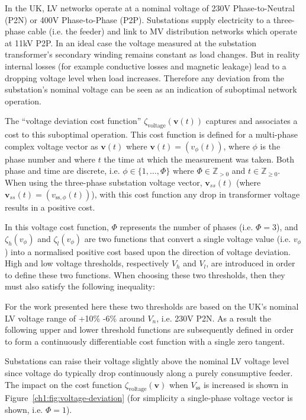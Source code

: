 In the UK, LV networks operate at a nominal voltage of 230V Phase-to-Neutral (P2N) or 400V Phase-to-Phase (P2P).
Substations supply electricity to a three-phase cable (i.e. the feeder) and link to MV distribution networks which operate at 11kV P2P.
In an ideal case the voltage measured at the substation transformer's secondary winding remains constant as load changes.
But in reality internal losses (for example conductive losses and magnetic leakage) lead to a dropping voltage level when load increases.
Therefore any deviation from the substation's nominal voltage can be seen as an indication of suboptimal network operation.

The ``voltage deviation cost function'' $\zeta_\text{voltage}(\textbf{v}(t))$ captures and associates a cost to this suboptimal operation.
This cost function is defined for a multi-phase complex voltage vector as $\textbf{v}(t)$ where $\textbf{v}(t) = (v_\phi(t))$, where $\phi$ is the phase number and where $t$ the time at which the measurement was taken.
Both phase and time are discrete, i.e. $\phi \in \{1,\dots,\Phi\}$ where $\Phi \in \mathbb{Z}_{>0}$ and $t \in \mathbb{Z}_{\geq0}$.
When using the three-phase substation voltage vector, $\textbf{v}_{ss}(t)$ (where $\textbf{v}_{ss}(t) = (v_{\text{ss},\phi}(t))$), with this cost function any drop in transformer voltage results in a positive cost.



In this voltage cost function, $\Phi$ represents the number of phases (i.e. $\Phi = 3$), and $\zeta_h(v_\phi)$ and $\zeta_l(v_\phi)$ are two functions that convert a single voltage value (i.e. $v_\phi$) into a normalised positive cost based upon the direction of voltage deviation.
High and low voltage thresholds, respectively $V_h$ and $V_l$, are introduced in order to define these two functions.
When choosing these two thresholds, then they must also satisfy the following inequality:



For the work presented here these two thresholds are based on the UK's nominal LV voltage range of +10\% -6\% around $V_n$, i.e. 230V P2N.
As a result the following upper and lower threshold functions are subsequently defined in order to form a continuously differentiable cost function with a single zero tangent.



Substations can raise their voltage slightly above the nominal LV voltage level since voltage do typically drop continuously along a purely consumptive feeder.
The impact on the cost function $\zeta_\text{voltage}(\textbf{v})$ when $V_\text{ss}$ is increased is shown in Figure~\ref{ch1:fig:voltage-deviation} (for simplicity a single-phase voltage vector is shown, i.e. $\Phi = 1$).

